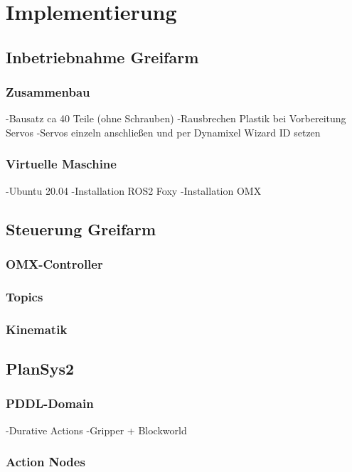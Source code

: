 \chapter{Implementierung}

\section {Inbetriebnahme Greifarm}
\subsection{Zusammenbau}
-Bausatz ca 40 Teile (ohne Schrauben)
-Rausbrechen Plastik bei Vorbereitung Servos
-Servos einzeln anschließen und per Dynamixel Wizard ID setzen
\subsection{Virtuelle Maschine}
-Ubuntu 20.04
-Installation ROS2 Foxy
-Installation OMX
\section{Steuerung Greifarm}
\subsection{OMX-Controller}
\subsection{Topics}
\subsection{Kinematik}


\section{PlanSys2}
\subsection{PDDL-Domain}
-Durative Actions
-Gripper + Blockworld
\subsection{Action Nodes}

